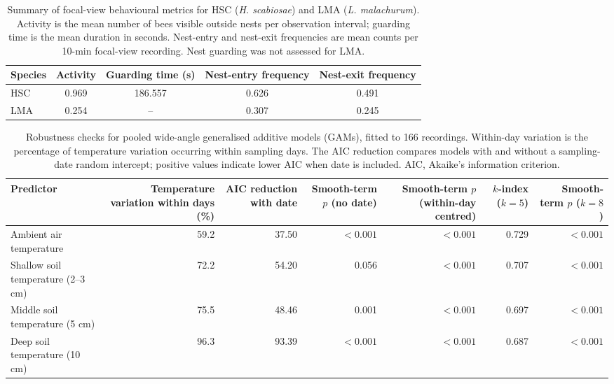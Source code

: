 \documentclass[11pt,a4paper]{article}
\begin{document}
\begin{table}[!htbp]
\centering
\caption{Summary of focal-view behavioural metrics for HSC (\textit{H. scabiosae}) and LMA (\textit{L. malachurum}). Activity is the mean number of bees visible outside nests per observation interval; guarding time is the mean duration in seconds. Nest-entry and nest-exit frequencies are mean counts per 10-min focal-view recording. Nest guarding was not assessed for LMA.}
\label{tab:focal_summary}

\normalsize
\renewcommand{\arraystretch}{1.15}

\begin{tabular}{lcccc}
\toprule
Species & Activity & Guarding time (s) & Nest-entry frequency & Nest-exit frequency \\
\midrule
HSC & 0.969 & 186.557 & 0.626 & 0.491 \\
LMA & 0.254 & -- & 0.307 & 0.245 \\
\bottomrule
\end{tabular}
\end{table}


\begin{table}[!htbp]
\centering
\small
\caption{Robustness checks for pooled wide-angle generalised additive models (GAMs), fitted to 166 recordings. Within-day variation is the percentage of temperature variation occurring within sampling days. The AIC reduction compares models with and without a sampling-date random intercept; positive values indicate lower AIC when date is included. AIC, Akaike's information criterion.}
\label{tab:wide_robustness}

\begin{tabular}{lrrrrrr}
\toprule
Predictor & Temperature variation within days (\%) & AIC reduction with date & Smooth-term $p$ (no date) & Smooth-term $p$ (within-day centred) & $k$-index ($k=5$) & Smooth-term $p$ ($k=8$) \\
\midrule
Ambient air temperature & 59.2 & 37.50 & $<0.001$ & $<0.001$ & 0.729 & $<0.001$ \\
Shallow soil temperature (2--3 cm) & 72.2 & 54.20 & 0.056 & $<0.001$ & 0.707 & $<0.001$ \\
Middle soil temperature (5 cm) & 75.5 & 48.46 & 0.001 & $<0.001$ & 0.697 & $<0.001$ \\
Deep soil temperature (10 cm) & 96.3 & 93.39 & $<0.001$ & $<0.001$ & 0.687 & $<0.001$ \\
\bottomrule
\end{tabular}
\end{table}
\end{document}
